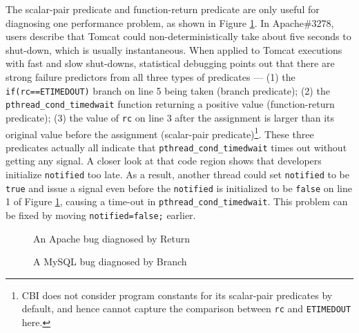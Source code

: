 The scalar-pair predicate and function-return predicate are only useful
for diagnosing one performance problem, as shown in 
Figure \ref{fig:Apache3278}.
In Apache\#3278, users describe that Tomcat could
non-deterministically take about five seconds to shut-down, which is usually
instantaneous. When applied to Tomcat executions
with fast and slow shut-downs, statistical debugging points out that there are
strong failure predictors from all three types of predicates --- 
(1) the \texttt{if(rc==ETIMEDOUT)} branch on line 5 being taken (branch predicate);
(2) the \texttt{pthread\_cond\_timedwait} function returning 
a positive value (function-return predicate);
(3) the value of \texttt{rc} on line 3 after the assignment is larger than its
original value before the assignment 
(scalar-pair predicate)\footnote{CBI does not consider program constants
for its scalar-pair predicates by default, and hence
cannot capture the comparison between \texttt{rc} and \texttt{ETIMEDOUT} here.}.
These three predicates actually all indicate that 
\texttt{pthread\_cond\_timedwait}
times out without getting any signal. 
A closer look at that code region shows that developers initialize
\texttt{notified} too late. 
As a result, another thread
could set \texttt{notified} to be \texttt{true} and issue a signal even
before the \texttt{notified} is initialized to be \texttt{false} on line 1 of
Figure \ref{fig:Apache3278}, causing a time-out in \texttt{pthread\_cond\_timedwait}. 
This problem can be fixed by moving \texttt{notified=false;} earlier.


\begin{figure}
\caption{An Apache bug diagnosed by Return}
\label{fig:Apache3278}
\end{figure}

%

\begin{figure}
\caption{A MySQL bug diagnosed by Branch}
\label{fig:MySQL44723}
\end{figure}


%



